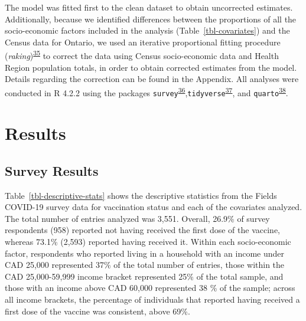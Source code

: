\documentclass[
  letterpaper,
  DIV=11,
  numbers=noendperiod]{scrartcl}
\begin{document}
The model was fitted first to the clean dataset to obtain uncorrected
estimates. Additionally, because we identified differences between the
proportions of all the socio-economic factors included in the analysis
(Table~\ref{tbl-covariates}) and the Census data for Ontario, we used an
iterative proportional fitting procedure
(\emph{raking})\textsuperscript{\protect\hyperlink{ref-deming1940}{35}}
to correct the data using Census socio-economic data and Health Region
population totals, in order to obtain corrected estimates from the
model. Details regarding the correction can be found in the Appendix.
All analyses were conducted in R 4.2.2 using the packages
\texttt{survey}\textsuperscript{\protect\hyperlink{ref-lumley2011}{36}},\texttt{tidyverse}\textsuperscript{\protect\hyperlink{ref-wickham2019}{37}},
and \texttt{quarto}\textsuperscript{\protect\hyperlink{ref-quarto}{38}}.

\hypertarget{results}{%
\section{Results}\label{results}}

\hypertarget{survey-results}{%
\subsection{Survey Results}\label{survey-results}}

Table~\ref{tbl-descriptive-stats} shows the descriptive statistics from
the Fields COVID-19 survey data for vaccination status and each of the
covariates analyzed. The total number of entries analyzed was 3,551.
Overall, 26.9\% of survey respondents (958) reported not having received
the first dose of the vaccine, whereas 73.1\% (2,593) reported having
received it. Within each socio-economic factor, respondents who reported
living in a household with an income under CAD 25,000 represented 37\%
of the total number of entries, those within the CAD 25,000-59,999
income bracket represented 25\% of the total sample, and those with an
income above CAD 60,000 represented 38 \% of the sample; across all
income brackets, the percentage of individuals that reported having
received a first dose of the vaccine was consistent, above 69\%.
\end{document}
